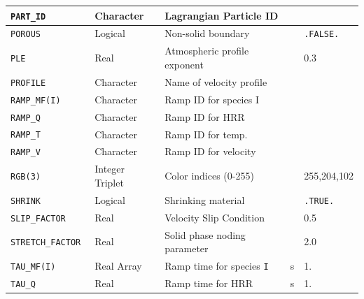 \documentclass[11pt]{book}
\newcommand{\ct}{\tt\small}
\begin{document}
\begin{longtable}{|l|l|l|l|l|}
{\ct PART\_ID}                        & Character       & Lagrangian Particle ID            &                     &                         \\ \hline
{\ct POROUS}                          & Logical         & Non-solid boundary                &                     & {\ct .FALSE.}           \\ \hline
{\ct PLE}                             & Real            & Atmospheric profile exponent      &                     & 0.3                     \\ \hline
{\ct PROFILE}                         & Character       & Name of velocity profile          &                     &                         \\ \hline
{\ct RAMP\_MF(I)}                     & Character       & Ramp ID for species I             &                     &                         \\ \hline
{\ct RAMP\_Q}                         & Character       & Ramp ID for HRR                   &                     &                         \\ \hline
{\ct RAMP\_T}                         & Character       & Ramp ID for temp.                 &                     &                         \\ \hline
{\ct RAMP\_V}                         & Character       & Ramp ID for velocity              &                     &                         \\ \hline
{\ct RGB(3)}                          & Integer Triplet & Color indices (0-255)             &                     & \small 255,204,102      \\ \hline
{\ct SHRINK}                          & Logical         & Shrinking material                &                     & {\ct .TRUE.}            \\ \hline
{\ct SLIP\_FACTOR    }                & Real            & Velocity Slip Condition           &                     & 0.5                     \\ \hline
{\ct STRETCH\_FACTOR    }             & Real            & Solid phase noding parameter      &                     & 2.0                     \\ \hline
{\ct TAU\_MF(I)}                      & Real Array      & Ramp time for species {\ct I}     & s                   & 1.     \\ \hline
{\ct TAU\_Q}                          & Real            & Ramp time for HRR                 & s                   & 1.     \\ \hline

\end{longtable}
\end{document}
